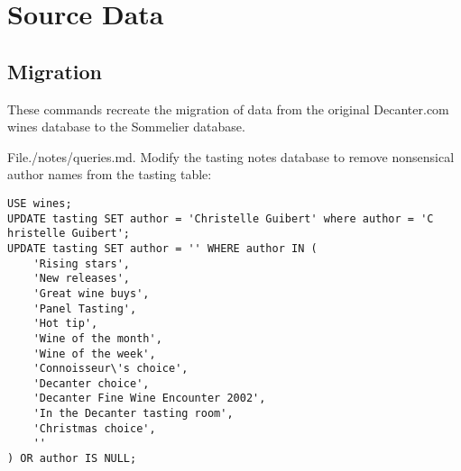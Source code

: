 \section{Source Data} \label{app:data}

\subsection{Migration} \label{app:datamigration}

These commands recreate the migration of data from the original Decanter.com wines database to the Sommelier database.

File./notes/queries.md. Modify the tasting notes database to remove nonsensical author names from the tasting table:

\begin{verbatim}
USE wines;
UPDATE tasting SET author = 'Christelle Guibert' where author = 'C hristelle Guibert';
UPDATE tasting SET author = '' WHERE author IN (
    'Rising stars',
    'New releases',
    'Great wine buys',
    'Panel Tasting',
    'Hot tip',
    'Wine of the month',
    'Wine of the week',
    'Connoisseur\'s choice',
    'Decanter choice',
    'Decanter Fine Wine Encounter 2002',
    'In the Decanter tasting room',
    'Christmas choice',
    ''
) OR author IS NULL;
\end{verbatim}



